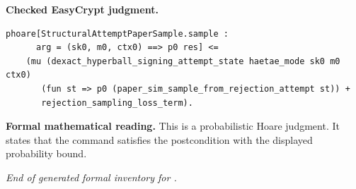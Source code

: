\begin{formaljudgment}
\noindent\textbf{Checked EasyCrypt judgment.}
\begin{lstlisting}[language=EasyCrypt,basicstyle=\ttfamily\scriptsize]
phoare[StructuralAttemptPaperSample.sample :
      arg = (sk0, m0, ctx0) ==> p0 res] <=
    (mu (dexact_hyperball_signing_attempt_state haetae_mode sk0 m0 ctx0)
       (fun st => p0 (paper_sim_sample_from_rejection_attempt st)) +
       rejection_sampling_loss_term).
\end{lstlisting}
\noindent\textbf{Formal mathematical reading.} This is a probabilistic Hoare judgment.  It states that the command satisfies the postcondition with the displayed probability bound.
\end{formaljudgment}

\medskip
\noindent\emph{End of generated formal inventory for .}
